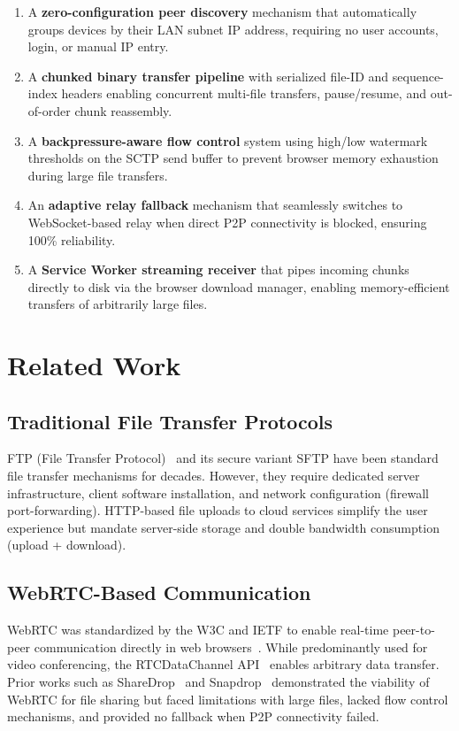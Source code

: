 \documentclass[conference]{IEEEtran}
\begin{document}
\begin{enumerate}
    \item A \textbf{zero-configuration peer discovery} mechanism that automatically groups devices by their LAN subnet IP address, requiring no user accounts, login, or manual IP entry.
    \item A \textbf{chunked binary transfer pipeline} with serialized file-ID and sequence-index headers enabling concurrent multi-file transfers, pause/resume, and out-of-order chunk reassembly.
    \item A \textbf{backpressure-aware flow control} system using high/low watermark thresholds on the SCTP send buffer to prevent browser memory exhaustion during large file transfers.
    \item An \textbf{adaptive relay fallback} mechanism that seamlessly switches to WebSocket-based relay when direct P2P connectivity is blocked, ensuring 100\% reliability.
    \item A \textbf{Service Worker streaming receiver} that pipes incoming chunks directly to disk via the browser download manager, enabling memory-efficient transfers of arbitrarily large files.
\end{enumerate}

\section{Related Work}

\subsection{Traditional File Transfer Protocols}
FTP (File Transfer Protocol)~\cite{rfc959} and its secure variant SFTP have been standard file transfer mechanisms for decades. However, they require dedicated server infrastructure, client software installation, and network configuration (firewall port-forwarding). HTTP-based file uploads to cloud services simplify the user experience but mandate server-side storage and double bandwidth consumption (upload + download).

\subsection{WebRTC-Based Communication}
WebRTC was standardized by the W3C and IETF to enable real-time peer-to-peer communication directly in web browsers~\cite{johnston2014webrtc}. While predominantly used for video conferencing, the RTCDataChannel API~\cite{rfc8831} enables arbitrary data transfer. Prior works such as ShareDrop~\cite{sharedrop} and Snapdrop~\cite{snapdrop} demonstrated the viability of WebRTC for file sharing but faced limitations with large files, lacked flow control mechanisms, and provided no fallback when P2P connectivity failed.
\end{document}
